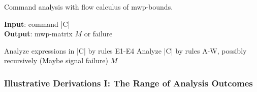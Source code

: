 \begin{algorithm}
    \caption[Command analysis with flow calculus of mwp-bounds]
    {Command analysis with flow calculus of mwp-bounds.}\label{alg:comms}
    \textbf{Input}: command \pr|C| \\
    \textbf{Output}: mwp-matrix \(M\) or failure
    \begin{algorithmic}[1]
        \State Analyze expressions in \pr|C| by rules E1-E4
        \State Analyze \pr|C| by rules A-W, possibly recursively
        \State (Maybe signal failure)
        \State \Return \(M\) 
    \end{algorithmic}
\end{algorithm}

\subsubsection{Illustrative Derivations I: The Range of Analysis Outcomes}\label{mwp-derivations}

